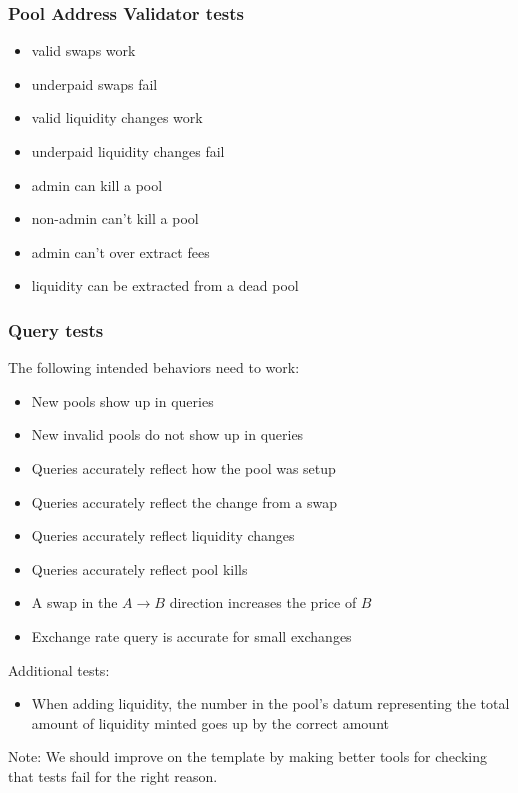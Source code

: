 \documentclass{article}
\begin{document}
\subsubsection{Pool Address Validator tests}

\begin{itemize}
	\item valid swaps work
	\item underpaid swaps fail
	\item valid liquidity changes work
	\item underpaid liquidity changes fail
	\item admin can kill a pool
	\item non-admin can't kill a pool
	\item admin can't over extract fees
	\item liquidity can be extracted from a dead pool
\end{itemize}

\subsubsection{Query tests}

The following intended behaviors need to work:
\begin{itemize}
	\item New pools show up in queries
	\item New invalid pools do not show up in queries
	\item Queries accurately reflect how the pool was setup
	\item Queries accurately reflect the change from a swap
	\item Queries accurately reflect liquidity changes
	\item Queries accurately reflect pool kills
	\item A swap in the $A \rightarrow B$ direction increases the price of $B$
	\item Exchange rate query is accurate for small exchanges
\end{itemize}

Additional tests:
\begin{itemize}
	\item When adding liquidity, the number in the pool's datum representing the
    total amount of liquidity minted goes up by the correct amount
\end{itemize}

Note: We should improve on the template by making better tools for checking that tests fail for the right reason.
\end{document}
